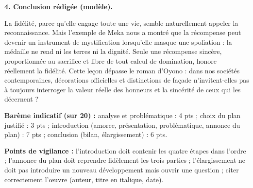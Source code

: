 \documentclass[11pt]{article}
\begin{document}
\begin{corrige}
\textbf{4. Conclusion rédigée (modèle).}

\og La fidélité, parce qu'elle engage toute une vie, semble naturellement appeler la reconnaissance. Mais l'exemple de Meka nous a montré que la récompense peut devenir un instrument de mystification lorsqu'elle masque une spoliation : la médaille ne rend ni les terres ni la dignité. Seule une récompense sincère, proportionnée au sacrifice et libre de tout calcul de domination, honore réellement la fidélité. Cette leçon dépasse le roman d'Oyono : dans nos sociétés contemporaines, décorations officielles et distinctions de façade n'invitent-elles pas à toujours interroger la valeur réelle des honneurs et la sincérité de ceux qui les décernent ? \fg{}

\textbf{Barème indicatif (sur 20) :} analyse et problématique : 4 pts ; choix du plan justifié : 3 pts ; introduction (amorce, présentation, problématique, annonce du plan) : 7 pts ; conclusion (bilan, élargissement) : 6 pts.

\textbf{Points de vigilance :} l'introduction doit contenir les quatre étapes dans l'ordre ; l'annonce du plan doit reprendre fidèlement les trois parties ; l'élargissement ne doit pas introduire un nouveau développement mais ouvrir une question ; citer correctement l'œuvre (auteur, titre en italique, date).
\end{corrige}
\end{document}
